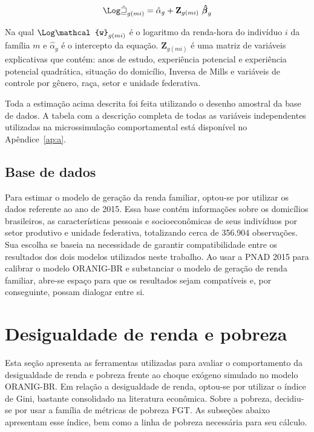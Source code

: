 \begin{align}
	\mathbf{\Log \mathcal{\hat{w}}}_{g(mi)} = \hat{\alpha}_g + \mathbf{Z}_{g(mi)} \ \boldsymbol{\hat{\beta}}_g \label{eq:step2}
\end{align}

Na qual $\mathbf{\Log \mathcal{w}}_{g(mi)}$ é o logaritmo da renda-hora do indivíduo $i$ da família $m$ e $\hat{\alpha}_g$ é o intercepto da equação. $\mathbf{Z}_{g(mi)}$ é uma matriz de variáveis explicativas que contém: anos de estudo, experiência potencial e experiência potencial quadrática, situação do domicílio, Inversa de Mills e variáveis de controle por gênero, raça, setor e unidade federativa.

Toda a estimação acima descrita foi feita utilizando o desenho amostral da base de dados. A tabela com a descrição completa de todas as variáveis independentes utilizadas na microssimulação comportamental está disponível no Apêndice~\ref{ap:a}.


\subsection{Base de dados} \label{subsec:dados_microssimulacao}

Para estimar o modelo de geração da renda familiar, optou-se por utilizar os dados  referente ao ano de 2015. Essa base contém informações	sobre os domicílios brasileiros, as características pessoais e socioeconômicas de seus indivíduos por setor produtivo e unidade federativa, totalizando cerca de 356.904 observações. Sua escolha se baseia na necessidade de garantir compatibilidade entre os resultados dos dois modelos utilizados neste trabalho. Ao usar a PNAD 2015 para calibrar o modelo ORANIG-BR e substanciar o modelo de geração de renda familiar, abre-se espaço para que os resultados sejam compatíveis e, por conseguinte, possam dialogar entre si.



\section{Desigualdade de renda e pobreza} \label{sec:desigualdade_pobreza}

Esta seção apresenta as ferramentas utilizadas para avaliar o comportamento da desigualdade de renda e pobreza frente ao choque exógeno simulado no modelo ORANIG-BR. Em relação a desigualdade de renda, optou-se por utilizar o índice de Gini, bastante consolidado na literatura econômica. Sobre a pobreza, decidiu-se por usar a família de métricas de pobreza FGT. As subseções abaixo apresentam esse índice, bem como a linha de pobreza necessária para seu cálculo.


